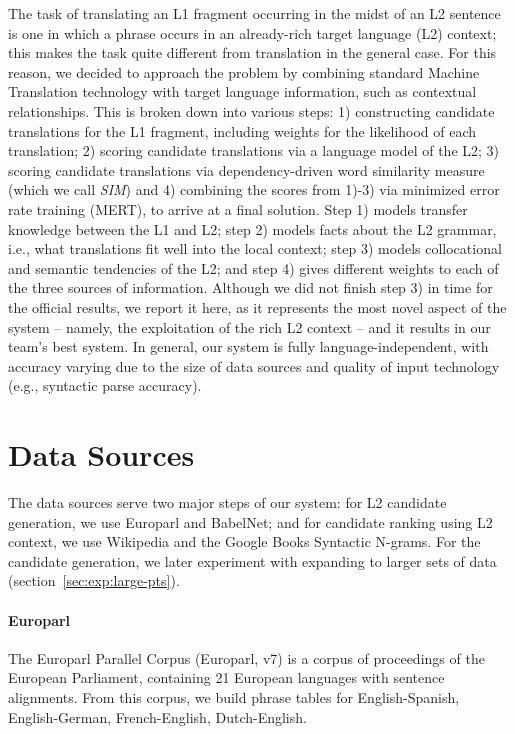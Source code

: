 \documentclass[11pt]{article}
\begin{document}
The task of translating an L1 fragment occurring in the midst of an L2 sentence is one in which a phrase occurs in an already-rich target language (L2) context; this makes the task quite different from translation in the general case. For this reason, we decided to approach the problem by combining standard Machine Translation technology with target language information,
such as contextual relationships. 
This is broken down into various steps: 1) constructing candidate translations for the L1 fragment, including weights for the likelihood of each translation; 2) scoring candidate translations via a language model of the L2; 3) scoring candidate translations via dependency-driven word similarity measure \cite{lin:98} (which we call \textit{SIM})
and 4) combining the scores from 1)-3) via minimized error rate training (MERT), to arrive at a final solution.  Step 1) models transfer knowledge between the L1 and L2; step 2) models facts about the L2 grammar, i.e., what translations fit well into the local context; step 3) models collocational and semantic tendencies of the L2; and step 4)  gives different weights to each of the three sources of information.  Although we did not finish step 3) in time for the official results, we report it here, as it represents the most novel aspect of the system -- namely, the exploitation of the rich L2 context -- and it results in our team's best system.  In general, our system is fully language-independent, with accuracy varying due to the size of data sources and quality of input technology (e.g., syntactic parse accuracy).

\section{Data Sources}
The data sources serve two major steps of our system: for L2 candidate generation, we use Europarl and BabelNet; and for candidate ranking using L2 context, we use Wikipedia and the Google Books Syntactic N-grams.  For the candidate generation, we later experiment with expanding to larger sets of data (section~\ref{sec:exp:large-pts}).

\paragraph{Europarl}  %
The Europarl Parallel Corpus (Europarl, v7) \cite{koehn:05} is a corpus of proceedings of the European Parliament, containing 21 European languages with sentence alignments.
From this corpus, we build phrase tables for English-Spanish, English-German, French-English, Dutch-English.
\end{document}
